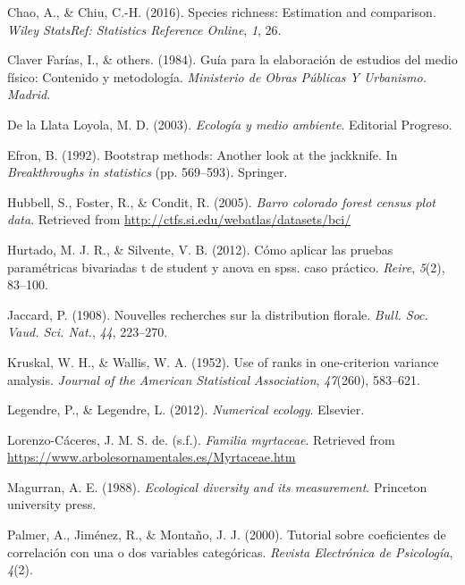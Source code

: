 \documentclass[11pt,]{article}
\begin{document}
\hypertarget{ref-chao2016species}{}
Chao, A., \& Chiu, C.-H. (2016). Species richness: Estimation and
comparison. \emph{Wiley StatsRef: Statistics Reference Online},
\emph{1}, 26.

\hypertarget{ref-claver1984guia}{}
Claver Farías, I., \& others. (1984). Guía para la elaboración de
estudios del medio físico: Contenido y metodología. \emph{Ministerio de
Obras Públicas Y Urbanismo. Madrid}.

\hypertarget{ref-de2003ecologia}{}
De la Llata Loyola, M. D. (2003). \emph{Ecología y medio ambiente}.
Editorial Progreso.

\hypertarget{ref-efron1992bootstrap}{}
Efron, B. (1992). Bootstrap methods: Another look at the jackknife. In
\emph{Breakthroughs in statistics} (pp. 569--593). Springer.

\hypertarget{ref-Hubbell2005barro}{}
Hubbell, S., Foster, R., \& Condit, R. (2005). \emph{Barro colorado
forest census plot data}. Retrieved from
\url{http://ctfs.si.edu/webatlas/datasets/bci/}

\hypertarget{ref-hurtado2012como}{}
Hurtado, M. J. R., \& Silvente, V. B. (2012). Cómo aplicar las pruebas
paramétricas bivariadas t de student y anova en spss. caso práctico.
\emph{Reire}, \emph{5}(2), 83--100.

\hypertarget{ref-jaccard1908nouvelles}{}
Jaccard, P. (1908). Nouvelles recherches sur la distribution florale.
\emph{Bull. Soc. Vaud. Sci. Nat.}, \emph{44}, 223--270.

\hypertarget{ref-kruskal1952use}{}
Kruskal, W. H., \& Wallis, W. A. (1952). Use of ranks in one-criterion
variance analysis. \emph{Journal of the American Statistical
Association}, \emph{47}(260), 583--621.

\hypertarget{ref-legendre2012numerical}{}
Legendre, P., \& Legendre, L. (2012). \emph{Numerical ecology}.
Elsevier.

\hypertarget{ref-josemyrtaceae}{}
Lorenzo-Cáceres, J. M. S. de. (s.f.). \emph{Familia myrtaceae}.
Retrieved from \url{https://www.arbolesornamentales.es/Myrtaceae.htm}

\hypertarget{ref-magurran1988ecological}{}
Magurran, A. E. (1988). \emph{Ecological diversity and its measurement}.
Princeton university press.

\hypertarget{ref-palmer2000tutorial}{}
Palmer, A., Jiménez, R., \& Montaño, J. J. (2000). Tutorial sobre
coeficientes de correlación con una o dos variables categóricas.
\emph{Revista Electrónica de Psicología}, \emph{4}(2).
\end{document}
